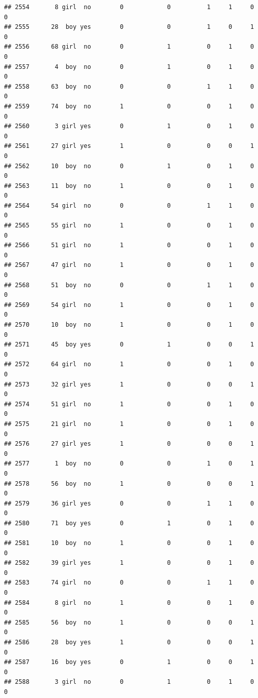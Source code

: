 \documentclass[man]{apa6}
\begin{document}
\begin{verbatim}
## 2554       8 girl  no        0            0          1     1     0     0
## 2555      28  boy yes        0            0          1     0     1     0
## 2556      68 girl  no        0            1          0     1     0     0
## 2557       4  boy  no        0            1          0     1     0     0
## 2558      63  boy  no        0            0          1     1     0     0
## 2559      74  boy  no        1            0          0     1     0     0
## 2560       3 girl yes        0            1          0     1     0     0
## 2561      27 girl yes        1            0          0     0     1     0
## 2562      10  boy  no        0            1          0     1     0     0
## 2563      11  boy  no        1            0          0     1     0     0
## 2564      54 girl  no        0            0          1     1     0     0
## 2565      55 girl  no        1            0          0     1     0     0
## 2566      51 girl  no        1            0          0     1     0     0
## 2567      47 girl  no        1            0          0     1     0     0
## 2568      51  boy  no        0            0          1     1     0     0
## 2569      54 girl  no        1            0          0     1     0     0
## 2570      10  boy  no        1            0          0     1     0     0
## 2571      45  boy yes        0            1          0     0     1     0
## 2572      64 girl  no        1            0          0     1     0     0
## 2573      32 girl yes        1            0          0     0     1     0
## 2574      51 girl  no        1            0          0     1     0     0
## 2575      21 girl  no        1            0          0     1     0     0
## 2576      27 girl yes        1            0          0     0     1     0
## 2577       1  boy  no        0            0          1     0     1     0
## 2578      56  boy  no        1            0          0     0     1     0
## 2579      36 girl yes        0            0          1     1     0     0
## 2580      71  boy yes        0            1          0     1     0     0
## 2581      10  boy  no        1            0          0     1     0     0
## 2582      39 girl yes        1            0          0     1     0     0
## 2583      74 girl  no        0            0          1     1     0     0
## 2584       8 girl  no        1            0          0     1     0     0
## 2585      56  boy  no        1            0          0     0     1     0
## 2586      28  boy yes        1            0          0     0     1     0
## 2587      16  boy yes        0            1          0     0     1     0
## 2588       3 girl  no        0            1          0     1     0     0

\end{verbatim}
\end{document}
